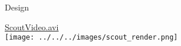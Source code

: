 \documentclass[xcolor=svgnames]{beamer}
\begin{document}
\begin{frame}{Design}
  \begin{center}
    \href{https://github.com/MorganAskins/scout/blob/master/scout.avi?raw=true}{ScoutVideo.avi}\\
    \texttt{[image: ../../../images/scout\_render.png]}
  \end{center}
\end{frame}

\end{document}
